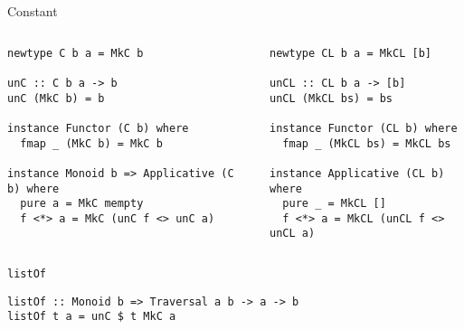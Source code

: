 \documentclass[presentation,aspectratio=169,8pt]{beamer}
\begin{document}
\begin{frame}[label={sec:org976c3ce},fragile]{Constant}
 \begin{columns}
\begin{column}{0.5\columnwidth}
\begin{verbatim}
newtype C b a = MkC b

unC :: C b a -> b
unC (MkC b) = b

instance Functor (C b) where
  fmap _ (MkC b) = MkC b

instance Monoid b => Applicative (C b) where
  pure a = MkC mempty
  f <*> a = MkC (unC f <> unC a)
\end{verbatim}
\end{column}

\begin{column}{0.5\columnwidth}
\begin{verbatim}
newtype CL b a = MkCL [b]

unCL :: CL b a -> [b]
unCL (MkCL bs) = bs

instance Functor (CL b) where
  fmap _ (MkCL bs) = MkCL bs

instance Applicative (CL b) where
  pure _ = MkCL []
  f <*> a = MkCL (unCL f <> unCL a)
\end{verbatim}
\end{column}
\end{columns}
\end{frame}

\begin{frame}[label={sec:org66285df},fragile]{\texttt{listOf}}
 \begin{verbatim}
listOf :: Monoid b => Traversal a b -> a -> b
listOf t a = unC $ t MkC a
\end{verbatim}
\end{frame}
\end{document}
